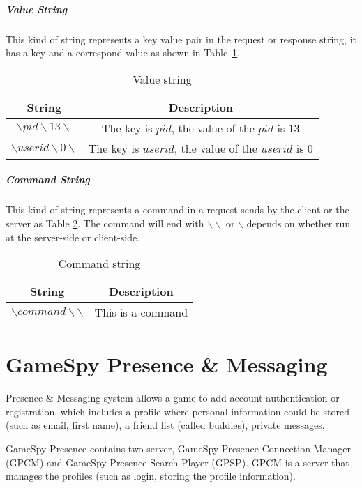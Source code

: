 \documentclass[oneside,titlepage,a4paper]{Definition/retrospy} %
\begin{document}
\paragraph{Value String}
This kind of string represents a key value pair in the request or response string, it has a key and a correspond value as shown in Table~\ref{Value string}.
\begin{table}[H]
	\centering
	\begin{tabular}{|c|c|}
		\hline 
		\textbf{String}&\textbf{Description}  \\ 
		\hline 
		$ \backslash pid \backslash  13  \backslash $& The key is $ pid $, the value of the $ pid $ is $  13  $  \\ 
		\hline
		$ \backslash userid \backslash  0  \backslash $& The key is $ userid $, the value of the $ userid $ is $  0  $  \\ 
		\hline
	\end{tabular} 
	\caption{Value string}
	\label{Value string}
\end{table}


\paragraph{Command String}

This kind of string represents a command in a request sends by the client or the server as Table \ref{Command string}.
The command will end with $ \backslash \backslash $ or $ \backslash $ depends on whether run at the server-side or client-side.


\begin{table}[H]
	\centering
	\begin{tabular}{|c|c|}
		\hline 
		\textbf{String}&\textbf{Description}  \\ 
		\hline 
		$ \backslash command \backslash\backslash $& This is a command \\ 		
		\hline
	\end{tabular} 
	\caption{Command string}
	\label{Command string}
\end{table}


\chapter{GameSpy Presence \& Messaging}
\par Presence \& Messaging system allows a game to add account authentication or registration, which includes a profile where personal information could be stored (such as email, first name), a friend list (called buddies), private messages.
\par GameSpy Presence contains two server, GameSpy Presence Connection Manager (GPCM) and GameSpy Presence Search Player (GPSP).
GPCM is a server that manages the profiles (such as login, storing the profile information).
\end{document}

